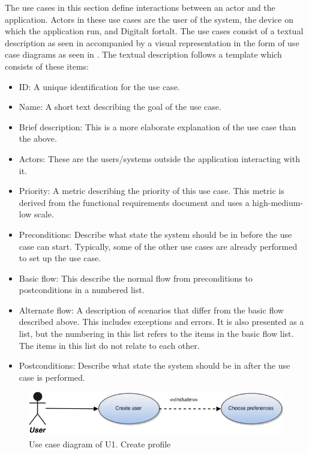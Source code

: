 The use cases in this section define interactions between an actor and the application. Actors in these use cases are the user of the system, the device on which the application run, and Digitalt fortalt. The use cases consist of a textual description as seen in \textbf{} accompanied by a visual representation in the form of use case diagrams as seen in \textbf{}. The textual description follows a template which consists of these items:
\begin{itemize}
\item ID: A unique identification for the use case.
\item Name: A short text describing the goal of the use case.
\item Brief description: This is a more elaborate explanation of the use case than the above.
\item Actors: These are the users/systems outside the application interacting with it.
\item Priority: A metric describing the priority of this use case. This metric is derived from the functional requirements document and uses a high-medium-low scale.
\item Preconditions: Describe what state the system should be in before the use case can start. Typically, some of the other use cases are already performed to set up the use case.
\item Basic flow: This describe the normal flow from preconditions to postconditions in a numbered list.
\item Alternate flow: A description of scenarios that differ from the basic flow described above. This includes exceptions and errors. It is also presented as a list, but the numbering in this list refers to the items in the basic flow list. The items in this list do not relate to each other.
\item Postconditions: Describe what state the system should be in after the use case is performed.
\end{itemize}

\begin{figure}[htp]
	\includegraphics[width=\textwidth]{fig/U1}
	\centering
	\caption{Use case diagram of U1. Create profile}
	\label{Fig:U1}
\end{figure}

